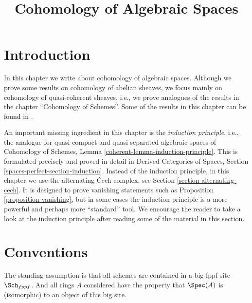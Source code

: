 

%


\title{Cohomology of Algebraic Spaces}

\maketitle

\label{section-phantom}

\tableofcontents




\section{Introduction}
\label{section-introduction}

\noindent
In this chapter we write about cohomology of algebraic spaces.
Although we prove some results on cohomology of abelian sheaves,
we focus mainly on cohomology of quasi-coherent sheaves, i.e.,
we prove analogues of the results in the chapter ``Cohomology of Schemes''.
Some of the results in this chapter can be found in \cite{Kn}.

\medskip\noindent
An important missing ingredient in this chapter is the
{\it induction principle}, i.e., the analogue for quasi-compact
and quasi-separated algebraic spaces of
Cohomology of Schemes, Lemma \ref{coherent-lemma-induction-principle}.
This is formulated precisely and proved in detail in
Derived Categories of Spaces, Section \ref{spaces-perfect-section-induction}.
Instead of the induction principle, in this chapter we use the
alternating {\v C}ech complex, see
Section \ref{section-alternating-cech}.
It is designed to prove vanishing statements such as
Proposition \ref{proposition-vanishing},
but in some cases the induction principle is a more powerful
and perhaps more ``standard'' tool. We encourage the reader
to take a look at the induction principle
after reading some of the material in this section.



\section{Conventions}
\label{section-conventions}

\noindent
The standing assumption is that all schemes are contained in
a big fppf site $\Sch_{fppf}$. And all rings $A$ considered
have the property that $\Spec(A)$ is (isomorphic) to an
object of this big site.

